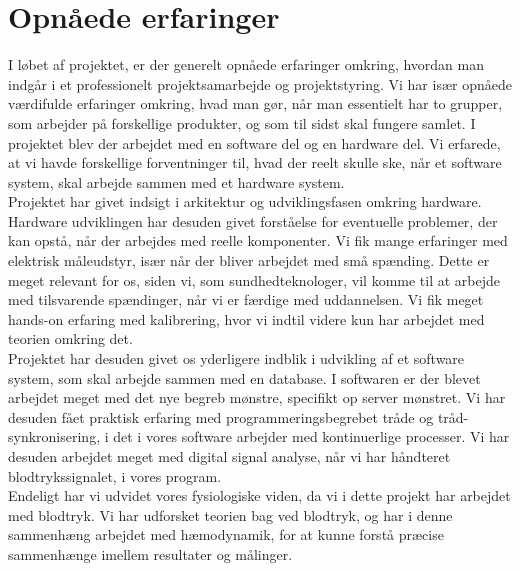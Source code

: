 \section{Opnåede erfaringer}
I løbet af projektet, er der generelt opnåede erfaringer omkring, hvordan man indgår i et professionelt projektsamarbejde og projektstyring. Vi har især opnåede værdifulde erfaringer omkring, hvad man gør, når man essentielt har to grupper, som arbejder på forskellige produkter, og som til sidst skal fungere samlet. I projektet blev der arbejdet med en software del og en hardware del.  Vi erfarede, at vi havde forskellige forventninger til, hvad der reelt skulle ske, når et software system, skal arbejde sammen med et hardware system. \\
Projektet har givet indsigt i arkitektur og udviklingsfasen omkring hardware. Hardware udviklingen har desuden givet forståelse for eventuelle problemer, der kan opstå, når der arbejdes med reelle komponenter. Vi fik mange erfaringer med elektrisk måleudstyr, især når der bliver arbejdet med små spænding. Dette er meget relevant for os, siden vi, som sundhedteknologer, vil komme til at arbejde med tilsvarende spændinger, når vi er færdige med uddannelsen. Vi fik meget hands-on erfaring med kalibrering, hvor vi indtil videre kun har arbejdet med teorien omkring det. \\
Projektet har desuden givet os yderligere indblik i udvikling af et software system, som skal arbejde sammen med en database. I softwaren er der blevet arbejdet meget med det nye begreb mønstre, specifikt op server mønstret. Vi har desuden fået praktisk erfaring med programmeringsbegrebet tråde og tråd-synkronisering, i det i vores software arbejder med kontinuerlige processer. Vi har desuden arbejdet meget med digital signal analyse, når vi har håndteret blodtrykssignalet, i vores program. \\
Endeligt har vi udvidet vores fysiologiske viden, da vi i dette projekt har arbejdet med blodtryk. Vi har udforsket teorien bag ved blodtryk, og har i denne sammenhæng arbejdet med hæmodynamik, for at kunne forstå præcise sammenhænge imellem resultater og målinger. \\

